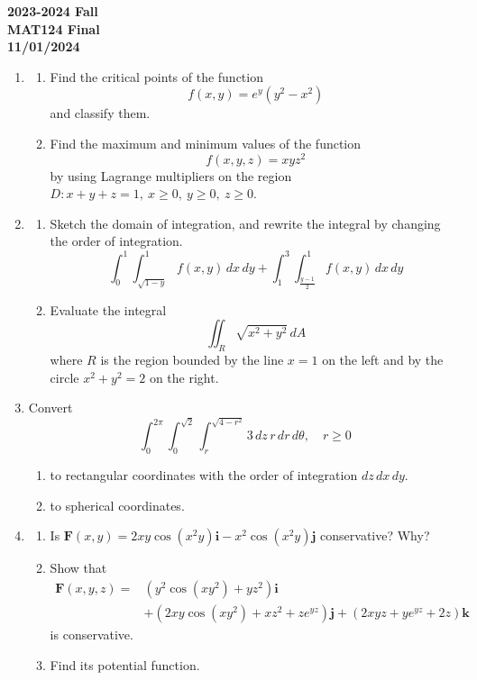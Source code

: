 \documentclass[a4paper, 12pt]{article}
\begin{document}
\pagestyle{empty}

\begin{center}
\textbf{2023-2024 Fall \\MAT124 Final\\11/01/2024}
\end{center}

\begin{enumerate}[leftmargin=*,label=\textbf{\arabic*.}]
\item \begin{enumerate}[leftmargin=*,label=\textbf{\alph*.}]
\item Find the critical points of the function
\[f(x,y)={e}^y\left(y^2-x^2\right)\]
and classify them.
\item Find the maximum and minimum values of the function
\[f(x,y,z)=xyz^2\]
by using Lagrange multipliers on the region $D:x+y+z=1,\:x\geq0,\:y\geq0,\:z\geq0$.
\end{enumerate}

\item \begin{enumerate}[leftmargin=*,label=\textbf{\alph*.}]
\item Sketch the domain of integration, and rewrite the integral by changing the order of integration.
\[\int_0^1\int_{\sqrt{1-y}}^1f(x,y)\,dx\,dy+\int_1^3\int_{\textstyle\frac{y-1}2}^1f(x,y)\,dx\,dy\]

\item Evaluate the integral
\[\iint_R\sqrt{x^2+y^2}\,dA\]
where $R$ is the region bounded by the line $x=1$ on the left and by the circle $x^2+y^2=2$ on the right.
\end{enumerate}

\item Convert
\[\int_0^{2\pi}\int_0^{\sqrt2}\int_r^{\sqrt{4-r^2}}3\,dz\,r\,dr\,d\theta,\quad r\geq0\]

\begin{enumerate}[leftmargin=*,label=\textbf{\alph*.}]
\item to rectangular coordinates with the order of integration $dz\,dx\,dy$.
\item to spherical coordinates.
\end{enumerate}

\item \begin{enumerate}[leftmargin=*,label=\textbf{\alph*.}]
\item Is $\mathbf{F}(x,y)=2xy\cos\left(x^2y\right)\mathbf{i}-x^2\cos\left(x^2y\right)\mathbf{j}$ conservative? Why?
\item Show that
\begin{align*}\mathbf{F}(x,y,z)=&\left(y^2\cos\left(xy^2\right)+yz^2\right)\mathbf{i}\\&+\left(2xy\cos\left(xy^2\right)+xz^2+z{e}^{yz}\right)\mathbf{j}+\left(2xyz+y{e}^{yz}+2z\right)\mathbf{k}\end{align*}
is conservative.
\item Find its potential function.
\end{enumerate}


\end{enumerate}
\end{document}
